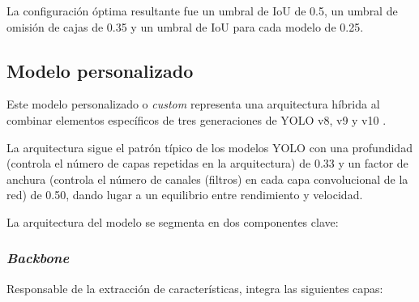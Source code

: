 \documentclass[12pt,a4paper,onecolumn,oneside]{report}
\begin{document}
La configuración óptima resultante fue un umbral de IoU de 0.5, un umbral de omisión de cajas de 0.35 y un umbral de IoU para cada modelo de 0.25.

\subsection{Modelo personalizado}
\label{sec:Modelo personalizado}
Este modelo personalizado o \textit{custom} representa una arquitectura híbrida al combinar elementos específicos de tres generaciones de YOLO v8, v9 y v10 \cite{repoTFM}. 

La arquitectura sigue el patrón típico de los modelos YOLO con una profundidad (controla el número de capas repetidas en la arquitectura) de 0.33 y un factor de anchura 
(controla el número de canales (filtros) en cada capa convolucional de la red) de 0.50, dando lugar a un equilibrio entre rendimiento y velocidad.

La arquitectura del modelo se segmenta en dos componentes clave:

\subsubsection{\textit{Backbone}}

Responsable de la extracción de características, integra las siguientes capas:

\begin{table}[H]
\caption{Estructura del \textit{backbone} del modelo personalizado}
\centering
{}
\end{table}
\end{document}
